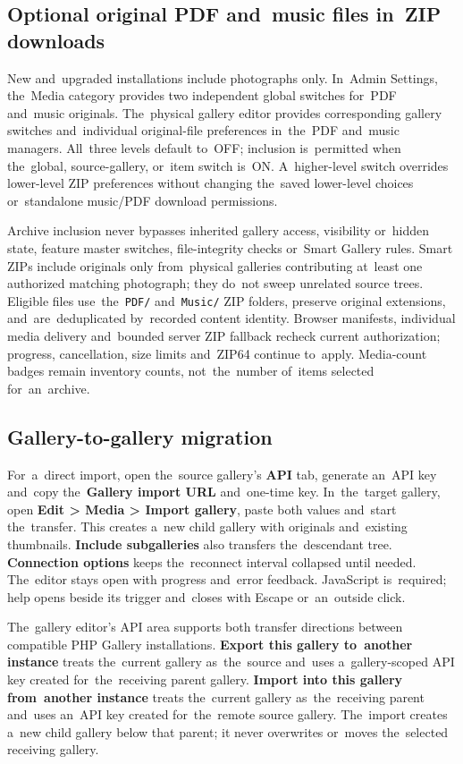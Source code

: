\documentclass[11pt,a4paper]{article}
\newcommand{\ui}[1]{\textbf{#1}}
\begin{document}
\subsection{Optional original PDF and~music files in~ZIP downloads}
New and~upgraded installations include photographs only. In~Admin Settings,
the~Media category provides two independent global switches for~PDF and~music
originals. The~physical gallery editor provides corresponding gallery switches
and~individual original-file preferences in~the~PDF and~music managers.
All~three levels default to~OFF; inclusion is~permitted when the~global,
source-gallery, or~item switch is~ON. A~higher-level switch overrides
lower-level ZIP preferences without changing the~saved lower-level choices
or~standalone music/PDF download permissions.

Archive inclusion never bypasses inherited gallery access, visibility or~hidden
state, feature master switches, file-integrity checks or~Smart Gallery rules.
Smart ZIPs include originals only from~physical galleries contributing at~least
one authorized matching photograph; they do~not sweep unrelated source trees.
Eligible files use~the~\texttt{PDF/} and~\texttt{Music/} ZIP folders, preserve
original extensions, and~are~deduplicated by~recorded content identity. Browser
manifests, individual media delivery and~bounded server ZIP fallback recheck
current authorization; progress, cancellation, size limits and~ZIP64 continue
to~apply. Media-count badges remain inventory counts, not~the~number of~items
selected for~an~archive.

\subsection{Gallery-to-gallery migration}

For~a~direct import, open the~source gallery's \ui{API} tab, generate
an~API key and~copy the~\ui{Gallery import URL} and~one-time key.
In~the~target gallery, open \ui{Edit > Media > Import gallery}, paste
both values and~start the~transfer. This creates a~new child gallery
with originals and~existing thumbnails. \ui{Include subgalleries}
also transfers the~descendant tree. \ui{Connection options} keeps
the~reconnect interval collapsed until needed. The~editor stays open
with progress and~error feedback. JavaScript is~required; help opens
beside its trigger and~closes with Escape or~an~outside click.

The~gallery editor's API area supports both transfer directions between
compatible PHP Gallery installations. \ui{Export this gallery to~another
instance} treats the~current gallery as~the~source and~uses a~gallery-scoped API
key created for~the~receiving parent gallery. \ui{Import into this gallery
from~another instance} treats the~current gallery as~the~receiving parent
and~uses an~API key created for~the~remote source gallery. The~import creates
a~new child gallery below that parent; it never overwrites or~moves the~selected
receiving gallery.
\end{document}
